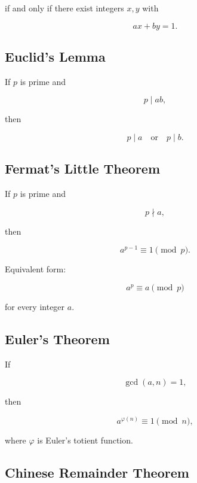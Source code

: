 if and only if there exist integers \(x,y\) with

\[
\boxed{
ax+by=1.
}
\]

\subsection{Euclid's Lemma}
\label{subsec:euclids-lemma-summary}

If \(p\) is prime and

\[
p\mid ab,
\]

then

\[
\boxed{
p\mid a
\quad
\text{or}
\quad
p\mid b.
}
\]

\subsection{Fermat's Little Theorem}
\label{subsec:fermats-little-theorem-summary}

If \(p\) is prime and

\[
p\nmid a,
\]

then

\[
\boxed{
a^{p-1}
\equiv
1
\pmod p.
}
\]

Equivalent form:

\[
\boxed{
a^p
\equiv
a
\pmod p
}
\]

for every integer \(a\).

\subsection{Euler's Theorem}
\label{subsec:eulers-theorem-number-summary}

If

\[
\gcd(a,n)=1,
\]

then

\[
\boxed{
a^{\varphi(n)}
\equiv
1
\pmod n,
}
\]

where \(\varphi\) is Euler's totient function.

\subsection{Chinese Remainder Theorem}
\label{subsec:crt-summary}

